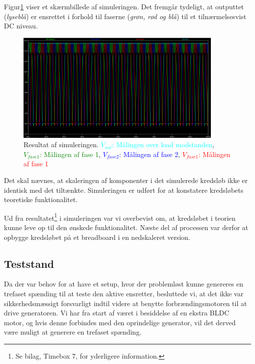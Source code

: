 Figur\ref{fig:prens6} viser et skærmbillede af simuleringen. Det fremgår tydeligt, at outputtet (\textit{lyseblå}) er ensrettet i forhold til faserne (\textit{grøn, rød og blå}) til et tilnærmelsesvist DC niveau. 

\begin{figure}[h]
  \centering
  \includegraphics[width=0.9\textwidth]{./figurer/prens6.png}
  \caption{Resultat af simuleringen. \textcolor{cyan}{$V_{out}$: Målingen over load modstanden}, \textcolor{green}{$V_{fase1}$: Målingen af fase 1}, \textcolor{blue}{$V_{fase2}$: Målingen af fase 2}, \textcolor{red}{$V_{fase1}$: Målingen af fase 1}}
  \label{fig:prens6}
\end{figure}

Det skal nævnes, at skaleringen af komponenter i det simulerede kredsløb ikke er identisk med det tiltænkte. Simuleringen er udført for at konstatere kredsløbets teoretiske funktionalitet.

Ud fra resultatet\footnote{Se bilag, Timebox 7, for yderligere information.} i simuleringen var vi overbevist om, at kredsløbet i teorien kunne leve op til den ønskede funktionalitet. Næste del af processen var derfor at opbygge kredsløbet på et breadboard i en nedskaleret version.

\subsection{Teststand}
\label{sec:teststand}

Da der var behov for at have et setup, hvor der problemløst kunne genereres en trefaset spænding til at teste den aktive ensretter, besluttede vi, at det ikke var sikkerhedsmæssigt forsvarligt indtil videre at benytte forbrændingsmotoren til at drive generatoren. Vi har fra start af været i besiddelse af en ekstra BLDC motor, og hvis denne forbindes med den oprindelige generator, vil det derved være muligt at generere en trefaset spænding.

